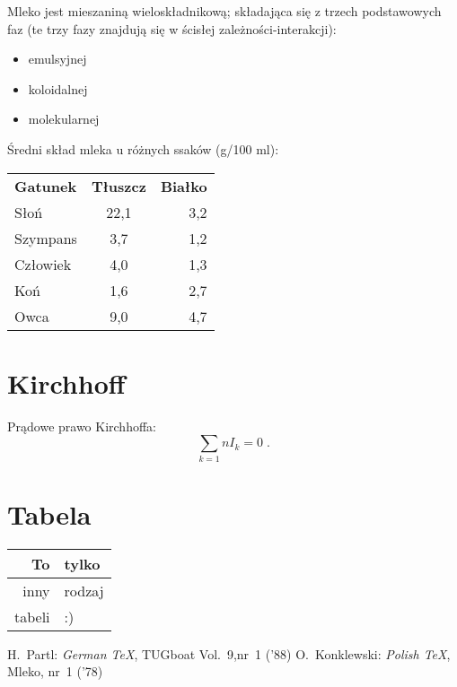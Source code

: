 \documentclass[a4paper,12pt]{article}
\begin{document}
Mleko jest mieszaniną wieloskładnikową; składająca się z trzech podstawowych faz (te trzy fazy znajdują się w ścisłej zależności-interakcji):

\begin{itemize}
  \item emulsyjnej
  \item koloidalnej
  \item molekularnej
\end{itemize}

Średni skład mleka u różnych ssaków (g/100 ml):


\begin{tabular}{ l || c | r }
  \textbf{Gatunek} & \textbf{Tłuszcz} & \textbf{Białko} \\
  Słoń & 22,1 & 3,2 \\
  Szympans & 3,7 & 1,2 \\
  Człowiek & 4,0 & 1,3 \\
  Koń & 1,6 & 2,7 \\
  Owca & 9,0 & 4,7 \\
\end{tabular}



\section{Kirchhoff}
Prądowe prawo Kirchhoffa:
\begin{equation}
\sum_{k=1}{n} I_k = 0 \; .
\end{equation}

\section{Tabela}
\begin{tabular}{|r|l|}
  \hline
  To & tylko \\
  \hline
  \hline
  inny & rodzaj \\
  \hline
  tabeli & :) \\
  \hline
\end{tabular}

\begin{thebibliography}{99}
 H.~Partl:
\emph{German \TeX},
TUGboat Vol.~9,nr~1 ('88)
 O.~Konklewski:
\emph{Polish \TeX},
Mleko, nr~1 ('78)
\end{thebibliography}
\end{document}

